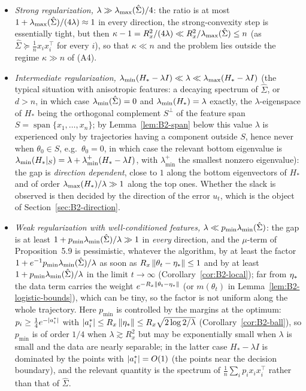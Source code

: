 \begin{itemize}
\item \emph{Strong regularization,} $\lambda\gg\lambda_{\max}(\hat\Sigma)/4$: the ratio is at most
$1+\lambda_{\max}(\hat\Sigma)/(4\lambda)\approx1$ in every direction, the strong-convexity step is essentially tight,
but then $\kappa-1=R_x^2/(4\lambda)\ll R_x^2/\lambda_{\max}(\hat\Sigma)\le n$ (as $\hat\Sigma\succcurlyeq\frac1nx_ix_i^\top$ for
every $i$), so that $\kappa\ll n$ and the problem lies outside the regime $\kappa\gg n$ of (A4).
\item \emph{Intermediate regularization,} $\lambda_{\min}(H_\ast-\lambda I)\ll\lambda\ll\lambda_{\max}(H_\ast-\lambda I)$ (the
typical situation with anisotropic features: a decaying spectrum of $\hat\Sigma$, or $d>n$, in which case
$\lambda_{\min}(\hat\Sigma)=0$ and $\lambda_{\min}(H_\ast)=\lambda$ exactly, the $\lambda$-eigenspace of $H_\ast$ being the orthogonal
complement $S^\perp$ of the feature span $S=\operatorname{span}\{x_1,\dots,x_n\}$; by Lemma~\ref{lem:B2-span} below
this value $\lambda$ is experienced only by trajectories having a component outside $S$, hence never when
$\theta_0\in S$, e.g.\ $\theta_0=0$, in which case the relevant bottom eigenvalue is
$\lambda_{\min}(H_\ast|_S)=\lambda+\lambda^+_{\min}(H_\ast-\lambda I)$, with $\lambda^+_{\min}$ the smallest nonzero eigenvalue):
the gap is \emph{direction dependent}, close to $1$
along the bottom eigenvectors of $H_\ast$ and of order $\lambda_{\max}(H_\ast)/\lambda\gg1$ along the top ones. Whether
the slack is observed is then decided by the direction of the error $u_t$, which is the object of
Section~\ref{sec:B2-direction}.
\item \emph{Weak regularization with well-conditioned features,} $\lambda\ll p_{\min}\lambda_{\min}(\hat\Sigma)$: the
gap is at least $1+p_{\min}\lambda_{\min}(\hat\Sigma)/\lambda\gg1$ in \emph{every} direction, and the
$\mu$-term of Proposition~5.9 is pessimistic, whatever the algorithm, by at least the factor
$1+e^{-1}p_{\min}\lambda_{\min}(\hat\Sigma)/\lambda$ as soon as $R_x\left\|\theta_t-\eta_\ast\right\|\le1$ and by at least
$1+p_{\min}\lambda_{\min}(\hat\Sigma)/\lambda$ in the limit $t\to\infty$ (Corollary~\ref{cor:B2-local}); far from $\eta_\ast$
the data term carries the weight $e^{-R_x\left\|\theta_t-\eta_\ast\right\|}$ (or $m(\theta_t)$ in
Lemma~\ref{lem:B2-logistic-bounds}), which can be tiny, so the factor is not uniform along the whole trajectory.
Here $p_{\min}$ is controlled by the margins at the optimum: $p_i\ge\frac14e^{-\left|a_i^\ast\right|}$ with
$\left|a_i^\ast\right|\le R_x\left\|\eta_\ast\right\|\le R_x\sqrt{2\log2/\lambda}$ (Corollary~\ref{cor:B2-ball}), so $p_{\min}$ is
of order $1/4$ when $\lambda\gtrsim R_x^2$ but may be exponentially small when $\lambda$ is small and the data are
nearly separable; in the latter case $H_\ast-\lambda I$ is dominated by the points with $\left|a_i^\ast\right|=O(1)$ (the
points near the decision boundary), and the relevant quantity is the spectrum of $\frac1n\sum_ip_ix_ix_i^\top$
rather than that of $\hat\Sigma$.
\end{itemize}
